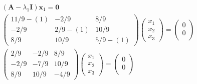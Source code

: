 \documentclass[12pt]{article}
\begin{document}
\begin{equation*}
	\begin{array}{c}
		\left(\mathbf{A}-\lambda_{1} \mathbf{I}\right) \mathbf{x}_{1}=\mathbf{0}                                            \\
		\left(\begin{array}{ccc}
				11 / 9-(1) & -2 / 9    & 8 / 9     \\
				-2 / 9     & 2 / 9-(1) & 10 / 9    \\
				8 / 9      & 10 / 9    & 5 / 9-(1)
			\end{array}\right)\left(\begin{array}{l}
				x_{1} \\
				x_{2} \\
				x_{3}
			\end{array}\right)=\left(\begin{array}{c}
				0 \\
				0 \\

			\end{array}\right) \\
		\left(\begin{array}{ccc}
				2 / 9  & -2 / 9 & 8 / 9  \\
				-2 / 9 & -7 / 9 & 10 / 9 \\
				8 / 9  & 10 / 9 & -4 / 9
			\end{array}\right)\left(\begin{array}{l}
				x_{1} \\
				x_{2} \\
				x_{3}
			\end{array}\right)=\left(\begin{array}{c}
				0 \\
				0 \\

			\end{array}\right)
	\end{array}
\end{equation*}
\end{document}
